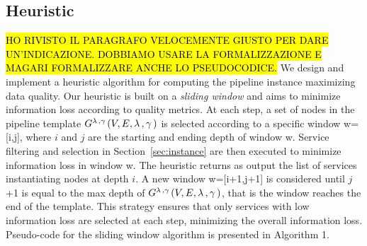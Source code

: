     \subsection{Heuristic}\label{subsec:heuristics}
    \hl{HO RIVISTO IL PARAGRAFO VELOCEMENTE GIUSTO PER DARE UN'INDICAZIONE. DOBBIAMO USARE LA FORMALIZZAZIONE E MAGARI FORMALIZZARE ANCHE LO PSEUDOCODICE.} We design and implement a heuristic algorithm for computing the pipeline instance maximizing data quality. Our heuristic is built on a \emph{sliding window} and aims to minimize information loss according to quality metrics. At each step, a set of nodes in the pipeline template $G^{\lambda\,,\gamma\,}(V,E,\lambda\,,\gamma\,)$ is selected according to a specific window w=[i,j], where $i$ and $j$ are the starting and ending depth of window w. Service filtering and selection in Section~\ref{sec:instance} are then executed to minimize information loss in window w. The heuristic returns as output the list of services instantiating nodes at depth $i$. A new window w=[i+1,j+1] is considered until $j$+1 is equal to the max depth of $G^{\lambda\,,\gamma\,}(V,E,\lambda\,,\gamma\,)$, that is the window reaches the end of the template.
This strategy ensures that only services with low information loss are selected at each step, minimizing the overall information loss. Pseudo-code for the sliding window algorithm is presented in Algorithm 1.


